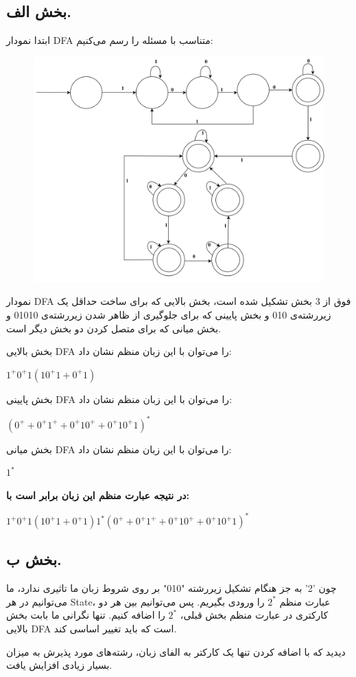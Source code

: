 \subsection*{بخش الف.}
ابتدا نمودار DFA متناسب با مسئله را رسم می‌کنیم:

\begin{figure}[htbp]
	\centering
	\includegraphics[width=1\textwidth]{q2p1.png}
\end{figure}

نمودار DFA فوق از 3 بخش تشکیل شده است، بخش بالایی که برای ساخت حداقل یک زیررشته‌ی 010 و بخش پایینی که برای جلوگیری از ظاهر شدن زیررشته‌ی 01010 و بخش میانی که برای متصل کردن دو بخش دیگر است.

بخش بالایی DFA را می‌توان با این زبان منظم نشان داد:

\setLTR
$1^+0^+1(10^+1 + 0^+1)$

\setRTL
بخش پایینی DFA را می‌توان با این زبان منظم نشان داد:

\setLTR
$(0^+ + 0^+1^+ + 0^+10^+ + 0^+10^+1)^*$

\setRTL
بخش میانی DFA را می‌توان با این زبان منظم نشان داد:

\setLTR
$1^*$

\setRTL

\textbf{در نتیجه عبارت منظم این زبان برابر است با:}
\setLTR

$1^+0^+1(10^+1 + 0^+1)1^*(0^+ + 0^+1^+ + 0^+10^+ + 0^+10^+1)^*$

\setRTL

\subsection*{بخش ب.}

چون '2' به جز هنگام تشکیل زیررشته "010" بر روی شروط زبان ما تاثیری ندارد، ما می‌توانیم در هر State، عبارت منظم $2^*$ را ورودی بگیریم. پس می‌توانیم بین هر دو کارکتری در عبارت منظم بخش قبلی، $2^*$ را اضافه کنیم. تنها نگرانی ما بابت بخش بالایی DFA است که باید تغییر اساسی کند.

دیدید که با اضافه کردن تنها یک کارکتر به الفای زبان، رشته‌های مورد پذیرش به میزان بسیار زیادی افزایش یافت.



